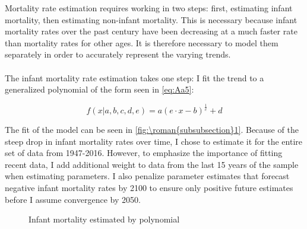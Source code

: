 \documentclass{article}
\renewcommand{\thesubsubsection}{\roman{subsubsection}}
\numberwithin{equation}{subsection}
\renewcommand{\subsubsection}[2][]{\oldsubsubsection[#1]{#2}\index{#1}\label{sec:\thesubsubsection}}
\newcommand*{\FigureDir}{../../graphs}
\begin{document}
\begin{appendices}

\subsubsection{Mortality}

Mortality rate estimation requires working in two steps: first, estimating infant mortality, then estimating non-infant mortality. This is necessary because infant mortality rates over the past century have been decreasing at a much faster rate than mortality rates for other ages. It is therefore necessary to model them separately in order to accurately represent the varying trends.
\\\\
The infant mortality rate estimation takes one step: I fit the trend to a generalized polynomial of the form seen in \ref{eq:Aa5}:

\begin{equation}
   f(x|a, b, c, d, e) = a (e \cdot x - b)^{\frac{1}{c}} + d
\end{equation}

\noindent
The fit of the model can be seen in \autoref{fig:\thesubsubsection1}. Because of the steep drop in infant mortality rates over time, I chose to estimate it for the entire set of data from 1947-2016. However, to emphasize the importance of fitting recent data, I add additional weight to data from the last 15 years of the sample when estimating parameters. I also penalize parameter estimates that forecast negative infant mortality rates by 2100 to ensure only positive future estimates before I assume convergence by 2050.

\begin{figure}[H]
   \centering
   \caption{\label{fig:\thesubsubsection1}Infant mortality estimated by polynomial}
\end{figure}


\end{appendices}
\end{document}
